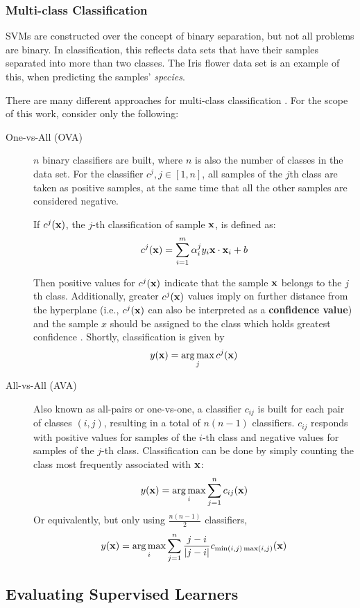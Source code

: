 \subsubsection{Multi-class Classification}

SVMs are constructed over the concept of binary separation, but not all problems are binary. In classification, this reflects data sets that have their samples separated into more than two classes. The Iris flower data set is an example of this, when predicting the samples' {\em species}.

There are many different approaches for multi-class classification \cite{rif2008}. For the scope of this work, consider only the following:

\begin{description}
	\item[One-vs-All (OVA)] $n$ binary classifiers are built, where $n$ is also the number of classes in the data set. For the classifier $c^j, j \in [1, n]$, all samples of the $j$th class are taken as positive samples, at the same time that all the other samples are considered negative.

	If $c^j(\mathbf{x})$, the $j$-th classification of sample $\mathbf{x}$, is defined as:
	$$c^j(\mathbf{x}) = \sum_{i=1}^{m} \alpha_i^j y_i \mathbf{x} \cdot \mathbf{x}_i + b$$

	Then positive values for $c^j(\mathbf{x})$ indicate that the sample $\mathbf{x}$ belongs to the $j$th class. Additionally, greater $c^j(\mathbf{x})$ values imply on further distance from the hyperplane (i.e., $c^j(\mathbf{x})$ can also be interpreted as a \textbf{confidence value}) and the sample $x$ should be assigned to the class which holds greatest confidence \cite{ovacj}. Shortly, classification is given by
	$$ y(\mathbf{x}) = \operatorname*{arg\,max}_j{c^j(\mathbf{x})} $$	
	\item[All-vs-All (AVA)] Also known as all-pairs or one-vs-one, a classifier $c_{ij}$ is built for each pair of classes $(i, j)$, resulting in a total of $n(n-1)$ classifiers. $c_{ij}$ responds with positive values for samples of the $i$-th class and negative values for samples of the $j$-th class. Classification can be done by simply counting the class most frequently associated with $\mathbf{x}$:
	$$ y(\mathbf{x}) = \operatorname*{arg\,max}_i{\sum_{j=1}^{n} c_{ij}(\mathbf{x})} $$
	Or equivalently, but only using $\frac{n(n-1)}{2}$ classifiers,
	$$ y(\mathbf{x}) = \operatorname*{arg\,max}_i{\sum_{j=1}^{n} \frac{j-i}{|j-i|} c_{\min(i, j) \max(i, j)}(\mathbf{x})} $$
\end{description}

\subsection{Evaluating Supervised Learners}

